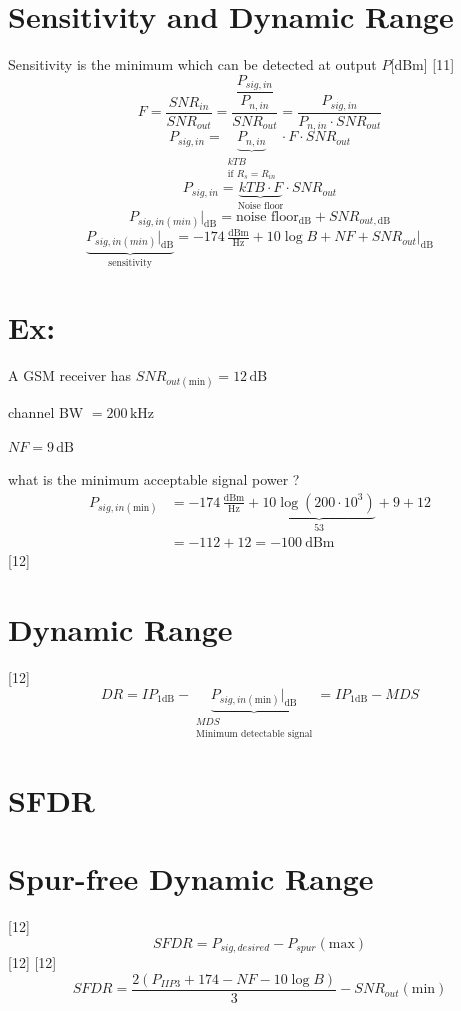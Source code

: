 \documentclass[11pt,a4paper]{article}
\begin{document}
\section{Sensitivity and Dynamic Range}
Sensitivity is the minimum which can be detected at output \quad $P$[dBm]
[11]
\[ F = \frac{SNR_{in}}{SNR_{out}} = \frac{\dfrac{P_{sig,in}}{P_{n,in}}}{SNR_{out}} = \frac{P_{sig,in}}{P_{n,in}\cdot SNR_{out}} \]
\[ P_{sig,in} = \underbrace{P_{n,in}}_{\substack{kTB\\ \text{if } R_s=R_{in}}}\cdot F\cdot SNR_{out} \]
\[ P_{sig,in} = \underbrace{kTB\cdot F}_{\text{Noise floor}}\cdot SNR_{out} \]
\[ P_{sig,in(min)}\Big|_{\mathrm{dB}} = \text{noise floor}_{\mathrm{dB}} + SNR_{out,\mathrm{dB}} \]
\[ \underbrace{P_{sig,in(min)}\Big|_{\mathrm{dB}}}_{\text{sensitivity}} = -174\,\tfrac{\mathrm{dBm}}{\mathrm{Hz}} + 10\log B + NF + SNR_{out}\Big|_{\mathrm{dB}} \]

\section{Ex:}
A GSM receiver has $SNR_{out(\mathrm{min})} = 12\,\mathrm{dB}$

channel BW $= 200\,\mathrm{kHz}$

$NF = 9\,\mathrm{dB}$

what is the minimum acceptable signal power ?
\begin{align*}
P_{sig,in(\mathrm{min})} &= -174\,\tfrac{\mathrm{dBm}}{\mathrm{Hz}} + \underbrace{10\log(200\cdot10^3)}_{53} + 9 + 12\\
&= -112 + 12 = -100\ \mathrm{dBm}
\end{align*}
[12]

\section{Dynamic Range}
[12]
\[ DR = IP_{1\mathrm{dB}} - \underbrace{P_{sig,in(\mathrm{min})}\Big|_{\mathrm{dB}}}_{\substack{MDS\\ \text{Minimum detectable signal}}} = IP_{1\mathrm{dB}} - MDS \]

\section{SFDR}
\section{Spur-free Dynamic Range}
[12]
\[ SFDR = P_{sig,desired} - P_{spur}(\mathrm{max}) \]
[12]
[12]
\[ SFDR = \frac{2\left(P_{IIP3}+174-NF-10\log B\right)}{3} - SNR_{out}(\mathrm{min}) \]
\end{document}

